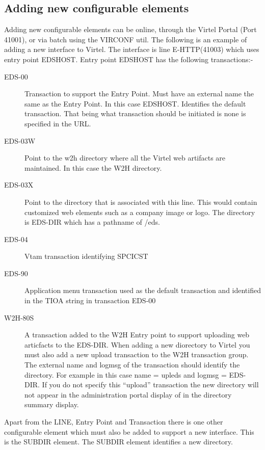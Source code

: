 \documentclass[letterpaper,10pt,english]{sphinxmanual}
\begin{document}
\subsection{Adding new configurable elements}
\label{\detokenize{connectivity_guide:adding-new-configurable-elements}}
Adding new configurable elements can be online, through the Virtel Portal (Port 41001), or via batch using the VIRCONF util. The following is an example of adding a new interface to Virtel. The interface is line E-HTTP(41003) which uses entry point EDSHOST. Entry point EDSHOST has the following transactions:-
\begin{description}
\item[{EDS-00}] \leavevmode
Transaction to support the Entry Point. Must have an external name the same as the Entry Point. In this case EDSHOST. Identifies the default transaction. That being what transaction should be initiated is none is specified in the URL.

\item[{EDS-03W}] \leavevmode
Point to the w2h directory where all the Virtel web artifacts are maintained. In this case the W2H directory.

\item[{EDS-03X}] \leavevmode
Point to the directory that is associated with this line. This would contain customized web elements such as a company image or logo. The directory is EDS-DIR which has a pathname of /eds.

\item[{EDS-04}] \leavevmode
Vtam transaction identifying SPCICST

\item[{EDS-90}] \leavevmode
Application menu transaction used as the default transaction and identified in the TIOA string in transaction EDS-00

\item[{W2H-80S}] \leavevmode
A transaction added to the W2H Entry point to support uploading web articfacts to the EDS-DIR. When adding a new diorectory to Virtel you must also add a new upload transaction to the W2H transaction group. The external name and logmsg of the transaction should identify the directory. For example in this case name = upleds and logmsg = EDS-DIR. If you do not specify this “upload” transaction the new directory will not appear in the administration portal display of in the directory summary display.

\end{description}

Apart from the LINE, Entry Point and Transaction there is one other configurable element which must also be added to support a new interface. This is the SUBDIR element. The SUBDIR element identifies a new directory.
\end{document}
